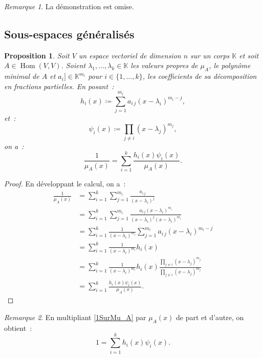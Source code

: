 \documentclass{article}
\DeclareMathOperator{\Hom}{Hom}
\newcommand{\K}{\mathbb K}
\newtheorem{prp}[thm]{Proposition}
\theoremstyle{definition}
\theoremstyle{remark}
\newtheorem*{rmq}{Remarque}
\begin{document}
		\begin{rmq} La démonstration est omise. \end{rmq}

	\subsection{Sous-espaces généralisés}
		\begin{prp} Soit $V$ un espace vectoriel de dimension $n$ sur un corps $\K$ et soit $A \in \Hom(V, V)$. Soient $\lambda_1, \dotsc, \lambda_k \in \K$
		les valeurs propres de $\mu_A$, le polynôme minimal de $A$ et $a_i] \in \K^{m_i}$ pour $i \in \{1, \dotsc, k\}$, les coefficients de sa décomposition en
		fractions partielles. En posant~:
		\[h_i(x) \coloneqq \sum_{j=1}^{m_i}a_{i\,j}(x-\lambda_i)^{m_i-j},\]
		et~:
		\[\psi_i(x) \coloneqq \prod_{j \neq i}(x-\lambda_j)^{m_j},\]
		on a~:
		\begin{equation}\label{1SurMu_A}
			\frac 1{\mu_A(x)} = \sum_{i=1}^k\frac {h_i(x)\psi_i(x)}{\mu_A(x)}.
		\end{equation}
		\end{prp}

		\begin{proof} En développant le calcul, on a~:
		\[
			\begin{aligned}
			\frac 1{\mu_A(x)} &= \sum_{i=1}^k\sum_{j=1}^{m_i}\frac {a_{i\,j}}{(x-\lambda_i)^j} \\
			                  &= \sum_{i=1}^k\sum_{j=1}^{m_i}\frac {a_{i\,j}(x-\lambda_i)^{m_i}}{(x-\lambda_i)^j(x-\lambda_i)^{m_i}} \\
			                  &= \sum_{i=1}^k\frac 1{(x-\lambda_i)^{m_i}}\sum_{j=1}^{m_i}a_{i\,j}(x-\lambda_i)^{m_i-j} \\
			                  &= \sum_{i=1}^k\frac 1{(x-\lambda_i)^{m_i}}h_i(x) \\
			                  &= \sum_{i=1}^k\frac 1{(x-\lambda_i)^{m_i}}h_i(x)\frac {\prod_{j \neq i}(x-\lambda_j)^{m_j}}{\prod_{j \neq i}(x-\lambda_j)^{m_j}} \\
			                  &= \sum_{i=1}^k\frac {h_i(x)\psi_i(x)}{\mu_A(x)}.
			\end{aligned}
		\]
		\end{proof}

		\begin{rmq} En multipliant \eqref{1SurMu_A} par $\mu_A(x)$ de part et d'autre, on obtient~:
		\begin{equation}\label{h_iPsi_i=1}
			1 = \sum_{i=1}^kh_i(x)\psi_i(x).
		\end{equation}
		\end{rmq}
\end{document}
